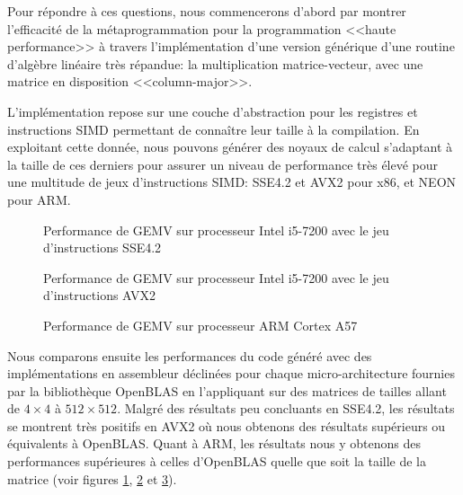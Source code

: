 \documentclass[main]{subfiles}
\begin{document}
Pour r\'epondre \`a ces questions, nous commencerons d'abord par montrer
l'efficacit\'e de la m\'etaprogrammation \cpp pour la programmation
<<haute performance>> \`a travers l'impl\'ementation d'une version
g\'en\'erique d'une routine d'alg\`ebre lin\'eaire tr\`es r\'epandue:
la multiplication matrice-vecteur, avec une matrice en disposition
<<column-major>>.

L'impl\'ementation repose sur une couche d'abstraction pour les registres et
instructions SIMD permettant de conna\^itre leur taille \`a la compilation.
En exploitant cette donn\'ee, nous pouvons g\'en\'erer des noyaux de calcul
s'adaptant \`a la taille de ces derniers pour assurer un niveau de performance
tr\`es \'elev\'e pour une multitude de jeux d'instructions SIMD: SSE4.2 et AVX2
pour x86, et NEON pour ARM.

\begin{figure}[h]
\fontsize{8}{10}\selectfont

\caption{
  Performance de GEMV sur processeur Intel i5-7200
  avec le jeu d'instructions SSE4.2
}
\label{fig:gemv-sse-bench-fr}
\end{figure}

\begin{figure}[h]
\fontsize{8}{10}\selectfont

\caption{
  Performance de GEMV sur processeur Intel i5-7200
  avec le jeu d'instructions AVX2
}
\label{fig:gemv-avx-bench-fr}
\end{figure}

\begin{figure}[h]
\fontsize{8}{10}\selectfont

\caption{
  Performance de GEMV sur processeur ARM Cortex A57
}
\label{fig:gemv-arm-bench-fr}
\end{figure}

Nous comparons ensuite les performances du code g\'en\'er\'e avec des
impl\'ementations en assembleur d\'eclin\'ees pour chaque micro-architecture
fournies par la biblioth\`eque OpenBLAS en l'appliquant sur des matrices de
tailles allant de $4 \times 4$ \`a $512 \times 512$.
Malgr\'e des r\'esultats peu concluants en SSE4.2, les r\'esultats se montrent
tr\`es positifs en AVX2 o\`u nous obtenons des r\'esultats sup\'erieurs ou
\'equivalents \`a OpenBLAS. Quant \`a ARM, les r\'esultats nous y obtenons
des performances sup\'erieures \`a celles d'OpenBLAS quelle que soit la taille
de la matrice (voir figures \ref{fig:gemv-sse-bench-fr},
\ref{fig:gemv-avx-bench-fr} et \ref{fig:gemv-arm-bench-fr}).
\\
\end{document}

